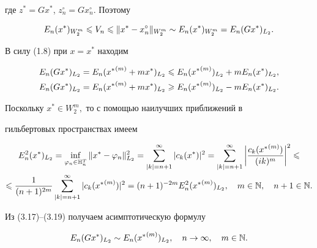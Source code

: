 где $z^*=Gx^*$, $z_n^\circ = Gx_n^\circ$. Поэтому


\begin{equation}


E_n(x^*)_{W_2^m} \lea V_n \lea \|x^* - x_n^\circ\|_{W_2^m} \sim


E_n(x^*)_{W_2^m} = E_n(Gx^*)_{L_2}.


\end{equation}





В силу (1.8) при $x = x^*$ находим


\begin{gather}


E_n(Gx^*)_{L_2} = E_n({x^*}^{(m)} + mx^*)_{L_2} \lea


E_n({x^*}^{(m)})_{L_2}+mE_n(x^*)_{L_2}, \\


%


E_n(Gx^*)_{L_2} = E_n({x^*}^{(m)} + mx^*)_{L_2} \gea


E_n({x^*}^{(m)})_{L_2}-mE_n(x^*)_{L_2}.


\end{gather}


Поскольку $x^*\in W_2^m,$ то с помощью наилучших приближений в


гильбертовых пространствах имеем


\begin{multline}


E_n^2(x^*)_{L_2} = \inf\limits_{\vp_n\in \bH_n^T}\|x^* -


\vp_n\|_{L_2}^2 = \suml_{|k| = n+1}^\infty|c_k(x^*)|^2 = 


\suml_{|k|=n+1}^\infty


\bigg|\frac{c_k({x^*}^{(m)})}{(ik)^m}\bigg|^2\lea \\ \lea


\frac{1}{(n+1)^{2m}}\suml_{|k|=n+1}^\infty|c_k({x^*}^{(m)})|^2=


(n+1)^{-2m}E_n^2({x^*}^{(m)})_{L_2},\quad m\in\N,\quad n+1\in \N.


\end{multline}


Из (3.17)--(3.19) получаем асимптотическую формулу


\begin{equation}


E_n(Gx^*)_{L_2}\sim E_n({x^*}^{(m)})_{L_2},\quad n\to \infty,\quad


m\in\N.


\end{equation}





